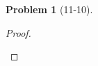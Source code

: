 \documentclass[11pt, a4paper]{article}
\theoremstyle{definition}
\newtheorem{prob}{Problem}
\newenvironment{problem}[1][]{\begin{prob}[#1]\normalfont}{\end{prob}\vspace{1.5em}}
\begin{document}
\begin{problem}[11-10]
\begin{proof}
\begin{itemize}
    





\end{itemize}
\end{proof}
\end{problem}
\end{document}
